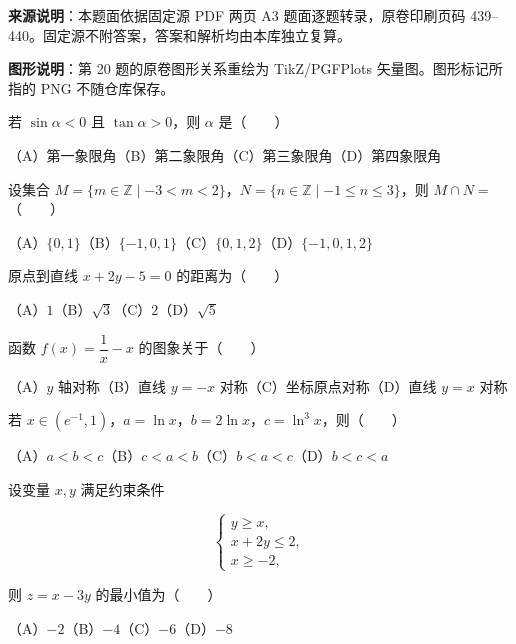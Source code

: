 


\begin{gktip}
\textbf{来源说明}：本题面依据固定源 PDF 两页 A3 题面逐题转录，原卷印刷页码 439–440。固定源不附答案，答案和解析均由本库独立复算。

\textbf{图形说明}：第 20 题的原卷图形关系重绘为 TikZ/PGFPlots 矢量图。图形标记所指的 PNG 不随仓库保存。
\end{gktip}


\begin{question}
若 $\sin\alpha<0$ 且 $\tan\alpha>0$，则 $\alpha$ 是\mbox{（　　）}

（A）第一象限角\quad（B）第二象限角\quad（C）第三象限角\quad（D）第四象限角

\end{question}
\begin{question}
设集合 $M=\{m\in\mathbb Z\mid-3<m<2\}$，$N=\{n\in\mathbb Z\mid-1\leqslant n\leqslant3\}$，则 $M\cap N=$\mbox{（　　）}

（A）$\{0,1\}$\quad（B）$\{-1,0,1\}$\quad（C）$\{0,1,2\}$\quad（D）$\{-1,0,1,2\}$

\end{question}
\begin{question}
原点到直线 $x+2y-5=0$ 的距离为\mbox{（　　）}

（A）$1$\quad（B）$\sqrt3$\quad（C）$2$\quad（D）$\sqrt5$

\end{question}
\begin{question}
函数 $f(x)=\dfrac1x-x$ 的图象关于\mbox{（　　）}

（A）$y$ 轴对称\quad（B）直线 $y=-x$ 对称\quad（C）坐标原点对称\quad（D）直线 $y=x$ 对称

\end{question}
\begin{question}
若 $x\in(e^{-1},1)$，$a=\ln x$，$b=2\ln x$，$c=\ln^3x$，则\mbox{（　　）}

（A）$a<b<c$\quad（B）$c<a<b$\quad（C）$b<a<c$\quad（D）$b<c<a$

\end{question}
\begin{question}
设变量 $x,y$ 满足约束条件

\nopagebreak[4]
\[
\begin{cases}
y\geqslant x,\\
x+2y\leqslant2,\\
x\geqslant-2,
\end{cases}
\]

则 $z=x-3y$ 的最小值为\mbox{（　　）}

（A）$-2$\quad（B）$-4$\quad（C）$-6$\quad（D）$-8$

\end{question}
